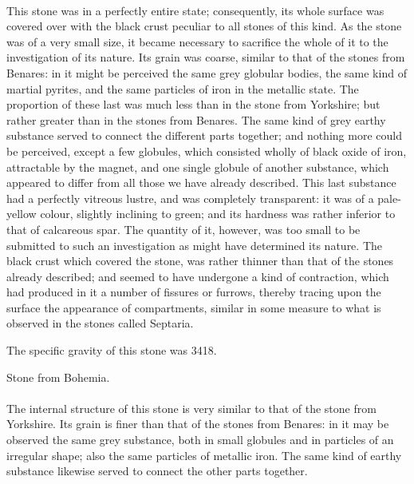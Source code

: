\documentclass[a4paper, 12pt, oneside]{article}
\begin{document}
\paragraph{}
This stone was in a perfectly entire state; consequently, its whole surface was covered over with the black crust peculiar to all stones of this kind. As the stone was of a very small size, it became necessary to sacrifice the whole of it to the investigation of its nature. Its grain was coarse, similar to that of the stones from Benares: in it might be perceived the same grey globular bodies, the same kind of martial pyrites, and the same particles of iron in the metallic state. The proportion of these last was much less than in the stone from Yorkshire; but rather greater than in the stones from Benares. The same kind of grey earthy substance served to connect the different parts together; and nothing more could be perceived, except a few globules, which consisted wholly of black oxide of iron, attractable by the magnet, and one single globule of another substance, which appeared to differ from all those we have already described. This last substance had a perfectly vitreous lustre, and was completely transparent: it was of a pale-yellow colour, slightly inclining to green; and its hardness was rather inferior to that of calcareous spar. The quantity of it, however, was too small to be submitted to such an investigation as might have determined its nature. The black crust which covered the stone, was rather thinner than that of the stones already described; and seemed to have undergone a kind of contraction, which had produced in it a number of fissures or furrows, thereby tracing upon the surface the appearance of compartments, similar in some measure to what is observed in the stones called Septaria.

The specific gravity of this stone was 3418.
\begin{center}
Stone from Bohemia.
\end{center}
\paragraph{}
The internal structure of this stone is very similar to that of the stone from Yorkshire. Its grain is finer than that of the stones from Benares: in it may be observed the same grey substance, both in small globules and in particles of an irregular shape; also the same particles of metallic iron. The same kind of earthy substance likewise served to connect the other parts together.
\end{document}
